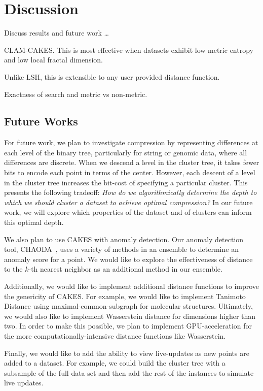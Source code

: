 \section{Discussion}
\label{sec:discussion}

Discuss results and future work \dots

CLAM-CAKES.
This is most effective when datasets exhibit low metric entropy and low local fractal dimension.

Unlike LSH, this is extensible to any user provided distance function.

Exactness of search and metric vs non-metric.


\subsection{Future Works}
\label{subsec:results:future-works}

For future work, we plan to investigate compression by representing differences at each level of the
binary tree, particularly for string or genomic data, where all differences are discrete.
When we descend a level in the cluster tree, it takes fewer bits to encode each point in terms of the center. 
However, each descent of a level in the cluster tree increases the bit-cost of specifying a particular cluster. 
This presents the following tradeoff: \emph{How do we algorithmically determine the depth to which we should cluster a dataset to achieve optimal compression?} 
In our future work, we will explore which properties of the dataset and of clusters can inform this optimal depth. 


We also plan to use CAKES with anomaly detection. Our anomaly detection tool, CHAODA~\cite{ishaq2021clustered}, uses 
a variety of methods in an ensemble to determine an anomaly score for a point. We would like to explore the effectiveness of 
distance to the $k$-th nearest neighbor as an additional method in our ensemble.


Additionally, we would like to implement additional distance functions to improve the genericity of CAKES. 
For example, we would like to implement Tanimoto Distance using maximal-common-subgraph for molecular structures. Ultimately, 
we would also like to implement Wasserstein distance for dimensions higher than two. In order to make this possible, 
we plan to implement GPU-acceleration for the more computationally-intensive distance functions like Wasserstein.

Finally, we would like to add the ability to view live-updates as new points are added to a dataset. For example, 
we could build the cluster tree with a subsample of the full data set and then add the rest of the instances to 
simulate live updates.

